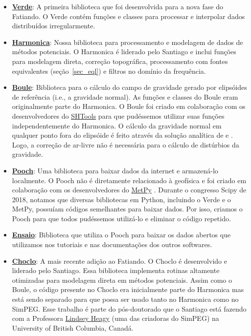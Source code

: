 \documentclass[12pt,a4paper,oneside]{book}
\begin{document}
\begin{itemize}
  \item \href{https://www.fatiando.org/verde}{\textbf{Verde}}:
    A primeira biblioteca que foi desenvolvida para a nova fase do Fatiando. O
    Verde contém funções e classes para processar e interpolar dados
    distribuídos irregularmente.
  \item \href{https://www.fatiando.org/harmonica}{\textbf{Harmonica}}:
    Nossa biblioteca para processamento e modelagem de dados de métodos
    potenciais. O Harmonica é liderado pelo Santiago e inclui funções para
    modelagem direta, correção topográfica, processamento com fontes
    equivalentes (seção~\ref{sec_eql}) e filtros no domínio da frequência.
  \item \href{https://www.fatiando.org/boule}{\textbf{Boule}}:
    Biblioteca para o cálculo do campo de gravidade gerado por elipsóides de
    referência (i.e., a gravidade normal). As funções e classes do Boule eram
    originalmente parte do Harmonica. O Boule foi criado em colaboração com os
    desenvolvedores do \href{https://github.com/SHTOOLS/SHTOOLS}{SHTools}
    \citep{Wieczorek2018} para que pudéssemos utilizar suas funções
    independentemente do Harmonica. O cálculo da gravidade normal em qualquer
    ponto fora do elipsóide é feito através da solução analítica de
    \citet{Lakshmanan1991} e \citet{Li2001}. Logo, a correção de ar-livre não é
    necessária para o cálculo de distúrbios da gravidade.
  \item \href{https://www.fatiando.org/pooch}{\textbf{Pooch}}:
    Uma biblioteca para baixar dados da internet e armazená-lo localmente. O
    Pooch não é diretamente relacionado à geofísica e foi criado em colaboração
    com os desenvolvedores do \href{https://github.com/Unidata/MetPy}{MetPy}
    \citep{May2016}. Durante o congresso Scipy de 2018, notamos que diversas
    bibliotecas em Python, incluindo o Verde e o MetPy, possuíam códigos
    semelhantes para baixar dados.
    Por isso, criamos o Pooch para que todos pudéssemos utilizá-lo e eliminar
    o código repetido.
  \item \href{https://www.fatiando.org/ensaio}{\textbf{Ensaio}}:
    Biblioteca que utiliza o Pooch para baixar os dados abertos que utilizamos
    nos tutoriais e nas documentações dos outros softwares.
  \item \href{https://www.fatiando.org/choclo}{\textbf{Choclo}}:
    A mais recente adição ao Fatiando. O Choclo é desenvolvido e liderado pelo
    Santiago. Essa biblioteca implementa rotinas altamente otimizadas para
    modelagem direta em métodos potenciais. Assim como o Boule, o código
    presente no Choclo era inicialmente parte do Harmonica mas está sendo
    separado para que possa ser usado tanto no Harmonica como no SimPEG. Esse
    trabalho é parte do pós-doutorado que o Santiago está fazendo com a
    Professora \href{https://lindseyjh.ca/}{Lindsey Heagy} (uma das criadoras
    do SimPEG) na University of British Columbia, Canadá.
\end{itemize}
\end{document}

